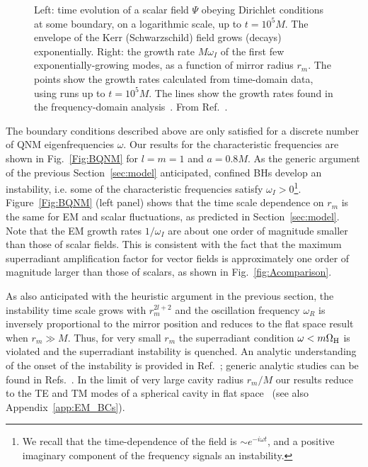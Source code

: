 \documentclass[11pt]{article}
\numberwithin{equation}{section} %
\begin{document}
%
\begin{figure}
 \caption{Left: time evolution of a scalar field $\Psi$ obeying Dirichlet conditions at some boundary, on a logarithmic scale, up to $t=10^5M$. The envelope of the Kerr (Schwarzschild) field grows (decays) exponentially. Right: the growth rate $M\omega_I$ of the first few exponentially-growing modes, as a function of mirror radius $r_m$. The points show the growth rates calculated from time-domain data, using runs up to $t=10^5M$. The lines show the growth rates found in the frequency-domain analysis~\cite{Cardoso:2004nk}. From Ref.~\cite{Dolan:2012yt}.}
\label{fig:timeseries2}
\end{figure}
%
The boundary conditions described above are only satisfied for a discrete number of QNM eigenfrequencies $\omega$. Our results for the characteristic frequencies are shown in
Fig.~\ref{Fig:BQNM} for $l=m=1$ and $a=0.8M$. As the generic argument of the previous Section~\ref{sec:model} anticipated, confined BHs develop an instability, i.e.
some of the characteristic frequencies satisfy $\omega_I>0$\footnote{We recall that the time-dependence of the field is $\sim e^{-i\omega t}$, and a positive imaginary component
of the frequency signals an instability.}. Figure~\ref{Fig:BQNM} (left panel) shows that the time scale dependence on 
$r_m$ is the same for EM and scalar fluctuations,
as predicted in Section~\ref{sec:model}. Note that the EM growth rates $1/\omega_I$ are about one order of magnitude 
smaller than those of scalar fields. This is consistent with the fact that the maximum superradiant amplification factor 
for vector fields is approximately one order of magnitude larger than those of scalars, as shown in 
Fig.~\ref{fig:Acomparison}.



As also anticipated with the heuristic argument in the previous section, the instability time scale grows with $r_m^{2l+2}$
and the oscillation frequency $\omega_R$ is inversely proportional to the mirror position and reduces to the flat space result when $r_m\gg M$. Thus, for very small $r_m$ the superradiant condition $\omega<m\Omega_{\rm H}$ is violated and the superradiant instability is quenched. An analytic understanding of the onset of the instability is provided in Ref.~\cite{Hod:2014uoa}; generic analytic studies can be found in
Refs.~\cite{Cardoso:2004nk,Hod:2009cp,Rosa:2009ei,Hod:2009cw}. 
In the limit of very large cavity radius $r_m/M$ our results reduce to the TE and TM modes of a spherical cavity in flat space~\cite{Jackson} (see also Appendix~\ref{app:EM_BCs}).
\end{document}
